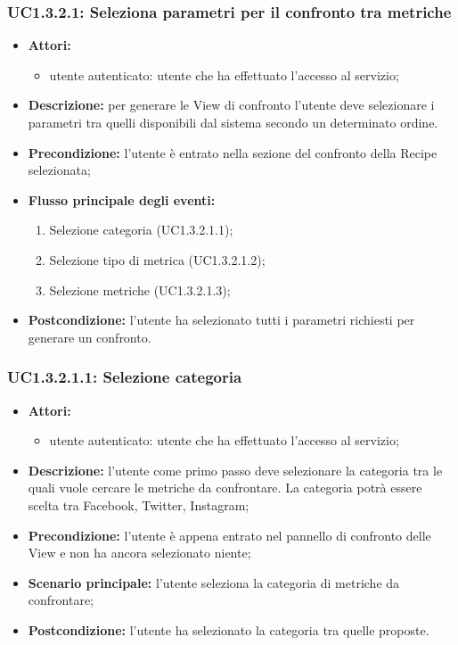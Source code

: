 \subsubsection{UC1.3.2.1: Seleziona parametri per il confronto tra metriche}
\begin{itemize}
	\item \textbf{Attori:}
	\begin{itemize}
		\item utente autenticato: utente che ha effettuato l'accesso al servizio;
	\end{itemize}
	\item \textbf{Descrizione:} per generare le View di confronto l'utente deve selezionare i parametri tra quelli disponibili dal sistema secondo un determinato ordine.
	\item \textbf{Precondizione:} l'utente è entrato nella sezione del confronto della Recipe selezionata;
	\item \textbf{Flusso principale degli eventi:}
	\begin{enumerate}
		\item Selezione categoria (UC1.3.2.1.1);
		\item Selezione tipo di metrica (UC1.3.2.1.2);
		\item Selezione metriche (UC1.3.2.1.3);
	\end{enumerate}
	\item \textbf{Postcondizione:} l'utente ha selezionato tutti i parametri richiesti per generare un confronto.
\end{itemize}

\subsubsection{UC1.3.2.1.1: Selezione categoria}
\begin{itemize}
	\item \textbf{Attori:}
	\begin{itemize}
		\item utente autenticato: utente che ha effettuato l'accesso al servizio;
	\end{itemize}
	\item \textbf{Descrizione:} l'utente come primo passo deve selezionare la categoria tra le quali vuole cercare le metriche da confrontare. La categoria potrà essere scelta tra Facebook, Twitter, Instagram;
	\item \textbf{Precondizione:} l'utente è appena entrato nel pannello di confronto delle View e non ha ancora selezionato niente;
	\item \textbf{Scenario principale:} l'utente seleziona la categoria di metriche da confrontare;
	\item \textbf{Postcondizione:} l'utente ha selezionato la categoria tra quelle proposte.
\end{itemize}


